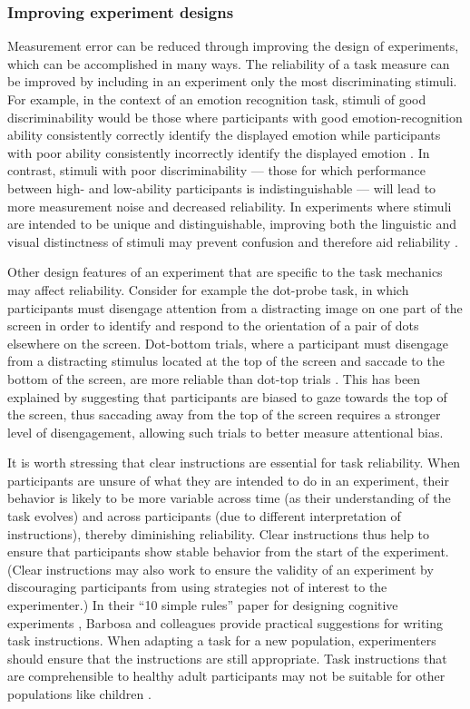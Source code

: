 \documentclass[a4paper,12pt]{article}
\begin{document}
\subsubsection{Improving experiment designs}

Measurement error can be reduced through improving the design of experiments, which can be accomplished in many ways. The reliability of a task measure can be improved by including in an experiment only the most discriminating stimuli. For example, in the context of an emotion recognition task, stimuli of good discriminability would be those where participants with good emotion-recognition ability consistently correctly identify the displayed emotion while participants with poor ability consistently incorrectly identify the displayed emotion \cite{keutmann2015generating}. In contrast, stimuli with poor discriminability --- those for which performance between high- and low-ability participants is indistinguishable --- will lead to more measurement noise and decreased reliability. In experiments where stimuli are intended to be unique and distinguishable, improving both the linguistic and visual distinctness of stimuli may prevent confusion and therefore aid reliability \cite{yoo2022importance}.  

Other design features of an experiment that are specific to the task mechanics may affect reliability. Consider for example the dot-probe task, in which participants must disengage attention from a distracting image on one part of the screen in order to identify and respond to the orientation of a pair of dots elsewhere on the screen. Dot-bottom trials, where a participant must disengage from a distracting stimulus located at the top of the screen and saccade to the bottom of the screen, are more reliable than dot-top trials \cite{price2015empirical, aday2019extended}. This has been explained by suggesting that participants are biased to gaze towards the top of the screen, thus saccading away from the top of the screen requires a stronger level of disengagement, allowing such trials to better measure attentional bias. 

It is worth stressing that clear instructions are essential for task reliability. When participants are unsure of what they are intended to do in an experiment, their behavior is likely to be more variable across time (as their understanding of the task evolves) and across participants (due to different interpretation of instructions), thereby diminishing reliability. Clear instructions thus help to ensure that participants show stable behavior from the start of the experiment. (Clear instructions may also work to ensure the validity of an experiment by discouraging participants from using strategies not of interest to the experimenter.) In their ``10 simple rules'' paper for designing cognitive experiments \cite{barbosa2022practical}, Barbosa and colleagues provide practical suggestions for writing task instructions. When adapting a task for a new population, experimenters should ensure that the instructions are still appropriate. Task instructions that are comprehensible to healthy adult participants may not be suitable for other populations like children \cite{hughes2002measuring}. 
\end{document}
